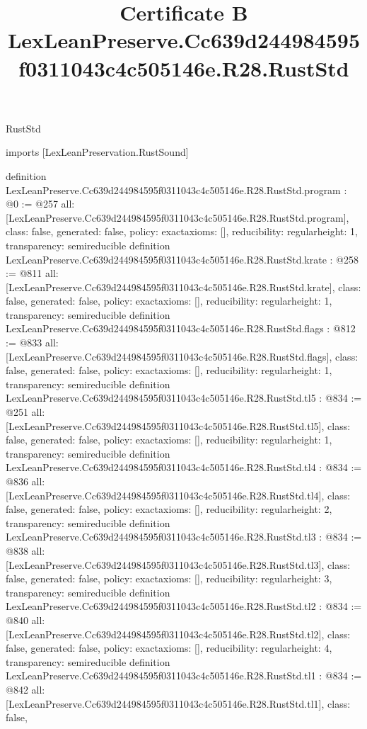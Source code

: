 \begin{lexlean}{RustStd}
\title{Certificate B LexLeanPreserve.Cc639d244984595f0311043c4c505146e.R28.RustStd}
\begin{coremodule}
imports [LexLeanPreservation.RustSound]

definition LexLeanPreserve.Cc639d244984595f0311043c4c505146e.R28.RustStd.program : @0 := @257 {
  all: [LexLeanPreserve.Cc639d244984595f0311043c4c505146e.R28.RustStd.program],
  class: false,
  generated: false,
  policy: exact{axioms: []},
  reducibility: regular{height: 1},
  transparency: semireducible
}
definition LexLeanPreserve.Cc639d244984595f0311043c4c505146e.R28.RustStd.krate : @258 := @811 {
  all: [LexLeanPreserve.Cc639d244984595f0311043c4c505146e.R28.RustStd.krate],
  class: false,
  generated: false,
  policy: exact{axioms: []},
  reducibility: regular{height: 1},
  transparency: semireducible
}
definition LexLeanPreserve.Cc639d244984595f0311043c4c505146e.R28.RustStd.flags : @812 := @833 {
  all: [LexLeanPreserve.Cc639d244984595f0311043c4c505146e.R28.RustStd.flags],
  class: false,
  generated: false,
  policy: exact{axioms: []},
  reducibility: regular{height: 1},
  transparency: semireducible
}
definition LexLeanPreserve.Cc639d244984595f0311043c4c505146e.R28.RustStd.tl5 : @834 := @251 {
  all: [LexLeanPreserve.Cc639d244984595f0311043c4c505146e.R28.RustStd.tl5],
  class: false,
  generated: false,
  policy: exact{axioms: []},
  reducibility: regular{height: 1},
  transparency: semireducible
}
definition LexLeanPreserve.Cc639d244984595f0311043c4c505146e.R28.RustStd.tl4 : @834 := @836 {
  all: [LexLeanPreserve.Cc639d244984595f0311043c4c505146e.R28.RustStd.tl4],
  class: false,
  generated: false,
  policy: exact{axioms: []},
  reducibility: regular{height: 2},
  transparency: semireducible
}
definition LexLeanPreserve.Cc639d244984595f0311043c4c505146e.R28.RustStd.tl3 : @834 := @838 {
  all: [LexLeanPreserve.Cc639d244984595f0311043c4c505146e.R28.RustStd.tl3],
  class: false,
  generated: false,
  policy: exact{axioms: []},
  reducibility: regular{height: 3},
  transparency: semireducible
}
definition LexLeanPreserve.Cc639d244984595f0311043c4c505146e.R28.RustStd.tl2 : @834 := @840 {
  all: [LexLeanPreserve.Cc639d244984595f0311043c4c505146e.R28.RustStd.tl2],
  class: false,
  generated: false,
  policy: exact{axioms: []},
  reducibility: regular{height: 4},
  transparency: semireducible
}
definition LexLeanPreserve.Cc639d244984595f0311043c4c505146e.R28.RustStd.tl1 : @834 := @842 {
  all: [LexLeanPreserve.Cc639d244984595f0311043c4c505146e.R28.RustStd.tl1],
  class: false,
}
\end{coremodule}
\end{lexlean}
